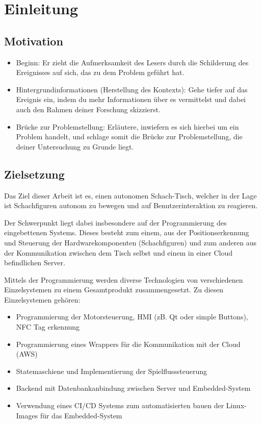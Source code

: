 \hypertarget{einleitung}{%
\section{Einleitung}\label{einleitung}}

\hypertarget{motivation}{%
\subsection{Motivation}\label{motivation}}

\begin{itemize}
\tightlist
\item
  Beginn: Er zieht die Aufmerksamkeit des Lesers durch die Schilderung
  des Ereignisses auf sich, das zu dem Problem geführt hat.
\item
  Hintergrundinformationen (Herstellung des Kontexts): Gehe tiefer auf
  das Ereignis ein, indem du mehr Informationen über es vermittelst und
  dabei auch den Rahmen deiner Forschung skizzierst.
\item
  Brücke zur Problemstellung: Erläutere, inwiefern es sich hierbei um
  ein Problem handelt, und schlage somit die Brücke zur Problemstellung,
  die deiner Untersuchung zu Grunde liegt.
\end{itemize}

\hypertarget{zielsetzung}{%
\subsection{Zielsetzung}\label{zielsetzung}}

Das Ziel dieser Arbeit ist es, einen autonomen Schach-Tisch, welcher in
der Lage ist Schachfiguren autonom zu bewegen und auf
Benutzerinteraktion zu reagieren.

Der Schwerpunkt liegt dabei insbesondere auf der Programmierung des
eingebettenen Systems. Dieses besteht zum einem, aus der
Positionserkennung und Steuerung der Hardwarekomponenten (Schachfiguren)
und zum anderen aus der Kommunikation zwischen dem Tisch selbst und
einem in einer Cloud befindlichen Server.

Mittels der Programmierung werden diverse Technologien von verschiedenen
Einzelsystemen zu einem Gesamtprodukt zusammengesetzt. Zu diesen
Einzelsystemen gehören:

\begin{itemize}
\tightlist
\item
  Programmierung der Motorsteuerung, HMI (zB. Qt oder simple Buttons),
  NFC Tag erkennung
\item
  Programmierung eines Wrappers für die Kommunikation mit der Cloud
  (AWS)
\item
  Statemaschiene und Implementierung der Spielflusssteuerung
\item
  Backend mit Datenbankanbindung zwischen Server und Embedded-System
\item
  Verwendung eines CI/CD Systems zum automatisierten bauen der
  Linux-Images für das Embedded-System
\end{itemize}

